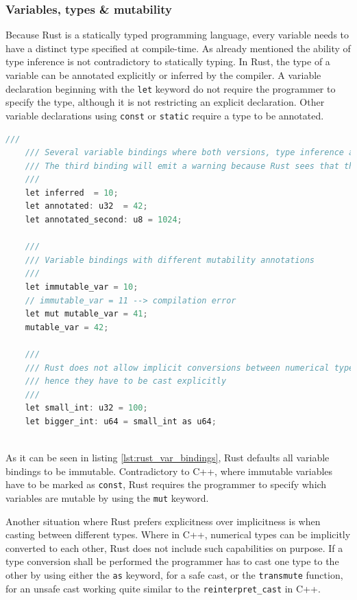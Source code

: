 \subsubsection{Variables, types \& mutability}

Because Rust is a statically typed programming language, every variable needs to have a distinct type specified at compile-time. As already mentioned the ability of type inference is not contradictory to statically typing. In Rust, the type of a variable can be annotated explicitly or inferred by the compiler. A variable declaration beginning with the \texttt{let} keyword do not require the programmer to specify the type, although it is not restricting an explicit declaration. Other variable declarations using \texttt{const} or \texttt{static} require a type to be annotated.\\

\begin{lstlisting}[caption={Variable bindings and mutability declarations in Rust}, label={lst:rust_var_bindings}, language=C]
	///
	/// Several variable bindings where both versions, type inference and type annotations, are showcased.
	/// The third binding will emit a warning because Rust sees that the literal exceeds the range of a 'u8'
	///
	let inferred  = 10;
	let annotated: u32 	= 42;
	let annotated_second: u8 = 1024;
	
	///
	/// Variable bindings with different mutability annotations
	///
	let immutable_var = 10;
	// immutable_var = 11 --> compilation error
	let mut mutable_var = 41;
	mutable_var = 42;
	
	///
	/// Rust does not allow implicit conversions between numerical types, 
	/// hence they have to be cast explicitly
	///
	let small_int: u32 = 100;
	let bigger_int: u64 = small_int as u64;
	
\end{lstlisting}

\noindent
As it can be seen in listing \ref{lst:rust_var_bindings}, Rust defaults all variable bindings to be immutable. Contradictory to C++, where immutable variables have to be marked as \texttt{const}, Rust requires the programmer to specify which variables are mutable by using the \texttt{mut} keyword.

Another situation where Rust prefers explicitness over implicitness is when casting between different types. Where in C++, numerical types can be implicitly converted to each other, Rust does not include such capabilities on purpose. If a type conversion shall be performed the programmer has to cast one type to the other by using either the \texttt{as} keyword, for a safe cast, or the \texttt{transmute} function, for an unsafe cast working quite similar to the \texttt{reinterpret\_cast} in C++.

